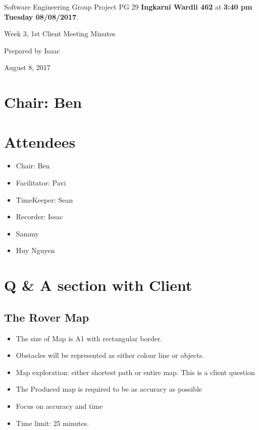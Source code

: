 \documentclass[11pt, a4paper]{article}
\begin{document}
\noindent Software Engineering Group Project PG 29 {\bf Ingkarni Wardli 462} at {\bf 3:40 pm Tuesday 08/08/2017}.
\vspace*{10pt}
\begin{center}
\huge Week 3, 1st Client Meeting Minutes
\end{center}
\vspace*{10pt}
\begin{center}
\huge Prepared by Isaac
\end{center}
\begin{center}
\huge August 8, 2017
\end{center}
\section*{Chair: Ben}

\section{Attendees}
\begin{itemize}
\item Chair: Ben
\item Facilitator: Pavi
\item TimeKeeper: Sean
\item Recorder: Issac
\item Sammy
\item Huy Nguyen
\end{itemize}



\section{Q \& A section with Client}
\subsection{The Rover Map}
\begin{itemize}
\item The size of Map is A1 with rectangular border.
\item Obstacles will be represented as either colour line or objects.
\item Map exploration: either shortest path or entire map. This is a client question
\item The Produced map is required to be as accuracy as possible
\item Focus on accuracy and time
\item Time limit: 25 minutes.

\end{itemize}
\end{document}
